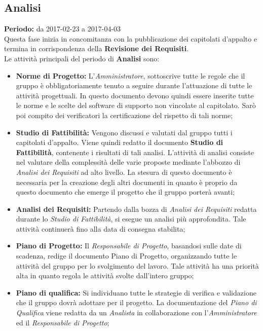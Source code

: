 	\subsection{Analisi}
	\textbf{Periodo:} da 2017-02-23 a 2017-04-03 \\
	Questa fase inizia in concomitanza con la pubblicazione dei capitolati d'appalto e termina in 		 corrispondenza della \textbf{Revisione dei Requisiti}. \\
	Le attività principali del periodo di \textbf{Analisi} sono: \\
	\begin{itemize}
		\item \textbf{Norme di Progetto:} L'\textit{Amministratore}, sottoscrive tutte le regole che il gruppo è obbligatoriamente tenuto a seguire durante l'attuazione di tutte le attività progettuali. In questo documento devono quindi essere inserite tutte le norme e le scelte del software di supporto non vincolate al capitolato. Sarò poi compito dei verificatori la certificazione del rispetto di tali norme;
		\item \textbf{Studio di Fattibilità:} Vengono discussi e valutati dal gruppo tutti i capitolati d'appalto. Viene quindi redatto il documento \textbf{Studio di Fattibilità}, contenente i risultati di tali analisi. L'attività di analisi consiste nel valutare della complessità delle varie proposte mediante l'abbozzo di \textit{Analisi dei Requisiti} ad alto livello. La stesura di questo documento è necessaria per la creazione degli altri documenti in quanto è proprio da questo documento che emerge il progetto che il gruppo porterà avanti;
		\item \textbf{Analisi dei Requisiti:} Partendo dalla bozza di \textit{Analisi dei Requisiti} redatta durante lo \textit{Studio di Fattibilità}, si esegue un analisi più approfondita. Tale attività continuerà fino alla data di consegna stabilita;
		\item \textbf{Piano di Progetto:} Il \textit{Responsabile di Progetto}, basandosi sulle date di scadenza, redige il documento Piano di Progetto, organizzando tutte le attività del gruppo per lo svolgimento del lavoro. Tale attività ha una priorità alta in quanto regola le attività svolte dall'intero gruppo;
		\item \textbf{Piano di qualifica:} Si individuano tutte le strategie di verifica e validazione che il gruppo dovrà adottare per il progetto. La documentazione del \textit{Piano di Qualifica} viene redatta da un \textit{Analista} in collaborazione con l'\textit{Amministratore} ed il \textit{Responsabile di Progetto};

\end{itemize}
